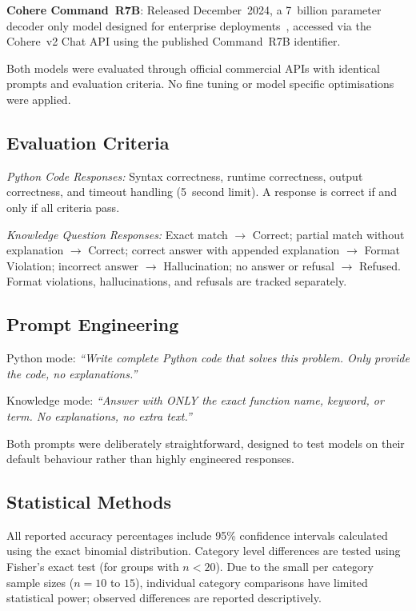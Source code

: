 \documentclass[12pt,a4paper]{article}
\begin{document}
\textbf{Cohere Command~R7B}: Released December~2024, a 7~billion parameter decoder only model designed for enterprise deployments~\cite{gomez2024commandr7b}, accessed via the Cohere~v2 Chat API using the published Command~R7B identifier.

Both models were evaluated through official commercial APIs with identical prompts and evaluation criteria. No fine tuning or model specific optimisations were applied.

\subsection{Evaluation Criteria}

\textit{Python Code Responses:} Syntax correctness, runtime correctness, output correctness, and timeout handling (5~second limit). A response is correct if and only if all criteria pass.

\textit{Knowledge Question Responses:} Exact match $\rightarrow$ Correct; partial match without explanation $\rightarrow$ Correct; correct answer with appended explanation $\rightarrow$ Format Violation; incorrect answer $\rightarrow$ Hallucination; no answer or refusal $\rightarrow$ Refused. Format violations, hallucinations, and refusals are tracked separately.

\subsection{Prompt Engineering}

Python mode: \emph{``Write complete Python code that solves this problem. Only provide the code, no explanations.''}

Knowledge mode: \emph{``Answer with ONLY the exact function name, keyword, or term. No explanations, no extra text.''}

Both prompts were deliberately straightforward, designed to test models on their default behaviour rather than highly engineered responses.

\subsection{Statistical Methods}

All reported accuracy percentages include 95\% confidence intervals calculated using the exact binomial distribution. Category level differences are tested using Fisher's exact test (for groups with $n<20$). Due to the small per category sample sizes ($n=10$ to $15$), individual category comparisons have limited statistical power; observed differences are reported descriptively.
\end{document}
